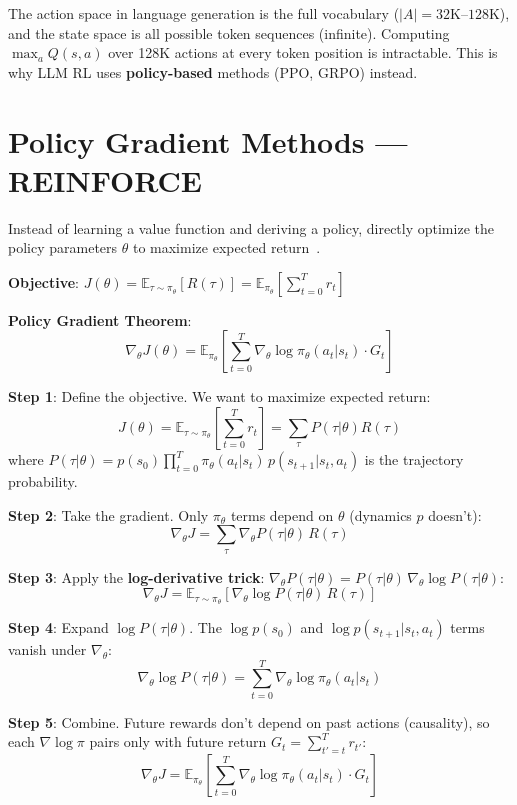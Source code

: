 \begin{warningbox}
The action space in language generation is the full vocabulary ($|A| = 32\text{K}$--$128\text{K}$), and the state space is all possible token sequences (infinite). Computing $\max_a Q(s,a)$ over 128K actions at every token position is intractable. This is why LLM RL uses \textbf{policy-based} methods (PPO, GRPO) instead.
\end{warningbox}

\newpage
\section{Policy Gradient Methods --- REINFORCE}
\label{policy-gradient-methods-reinforce}

Instead of learning a value function and deriving a policy, directly optimize the policy parameters $\theta$ to maximize expected return~\cite{williams1992simple}.

\textbf{Objective}: $J(\theta) = \mathbb{E}_{\tau \sim \pi_\theta}[R(\tau)] = \mathbb{E}_{\pi_\theta}\left[\sum_{t=0}^T r_t\right]$

\textbf{Policy Gradient Theorem}: 
\begin{equation}
\boxed{\nabla_\theta J(\theta) = \mathbb{E}_{\pi_\theta}\left[\sum_{t=0}^T \nabla_\theta \log \pi_\theta(a_t|s_t) \cdot G_t\right]}
\end{equation}

\begin{keybox}
\textbf{Step 1}: Define the objective. We want to maximize expected return: 
\[
J(\theta) = \mathbb{E}_{\tau \sim \pi_\theta}\!\left[\sum_{t=0}^T r_t\right] = \sum_\tau P(\tau|\theta) R(\tau)
\]
 where $P(\tau|\theta) = p(s_0)\prod_{t=0}^T \pi_\theta(a_t|s_t)\, p(s_{t+1}|s_t, a_t)$ is the trajectory probability.

\textbf{Step 2}: Take the gradient. Only $\pi_\theta$ terms depend on $\theta$ (dynamics $p$ doesn’t): 
\[
\nabla_\theta J = \sum_\tau \nabla_\theta P(\tau|\theta)\, R(\tau)
\]

\textbf{Step 3}: Apply the \textbf{log-derivative trick}: $\nabla_\theta P(\tau|\theta) = P(\tau|\theta)\, \nabla_\theta \log P(\tau|\theta)$: 
\[
\nabla_\theta J = \mathbb{E}_{\tau \sim \pi_\theta}\!\left[\nabla_\theta \log P(\tau|\theta)\, R(\tau)\right]
\]

\textbf{Step 4}: Expand $\log P(\tau|\theta)$. The $\log p(s_0)$ and $\log p(s_{t+1}|s_t,a_t)$ terms vanish under $\nabla_\theta$: 
\[
\nabla_\theta \log P(\tau|\theta) = \sum_{t=0}^T \nabla_\theta \log \pi_\theta(a_t|s_t)
\]

\textbf{Step 5}: Combine. Future rewards don’t depend on past actions (causality), so each $\nabla\log\pi$ pairs only with future return $G_t = \sum_{t'=t}^T r_{t'}$: 
\[
\boxed{\nabla_\theta J = \mathbb{E}_{\pi_\theta}\!\left[\sum_{t=0}^T \nabla_\theta \log \pi_\theta(a_t|s_t) \cdot G_t\right]}
\]
\end{keybox}

